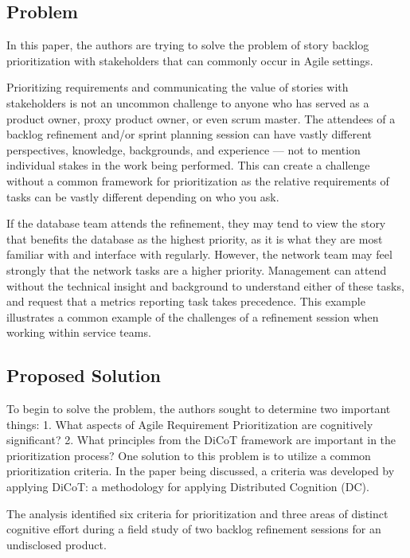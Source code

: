 \subsection{Problem}
In this paper\cite{buchan2020applying}, the authors are trying to solve the problem of story backlog prioritization with stakeholders that can commonly occur in Agile settings.

Prioritizing requirements and communicating the value of stories with stakeholders is not an uncommon challenge to anyone who has served as a product owner, proxy product owner, or even scrum master. The attendees of a backlog refinement and/or sprint planning session can have vastly different perspectives, knowledge, backgrounds, and experience --- not to mention individual stakes in the work being performed. This can create a challenge without a common framework for prioritization as the relative requirements of tasks can be vastly different depending on who you ask.

If the database team attends the refinement, they may tend to view the story that benefits the database as the highest priority, as it is what they are most familiar with and interface with regularly. However, the network team may feel strongly that the network tasks are a higher priority. Management can attend without the technical insight and background to understand either of these tasks, and request that a metrics reporting task takes precedence. This example illustrates a common example of the challenges of a refinement session when working within service teams.

\subsection{Proposed Solution}
To begin to solve the problem, the authors sought to determine two important things:
1. What aspects of Agile Requirement Prioritization are cognitively significant?
2. What principles from the DiCoT framework are important in the prioritization process?
One solution to this problem is to utilize a common prioritization criteria. In the paper being discussed\cite{buchan2020applying}, a criteria was developed by applying DiCoT\cite{blandford2005dicot}: a methodology for applying Distributed Cognition (DC)\cite{hutchins2000distributed}.

The analysis identified six criteria for prioritization and three areas of distinct cognitive effort during a field study of two backlog refinement sessions for an undisclosed product.

